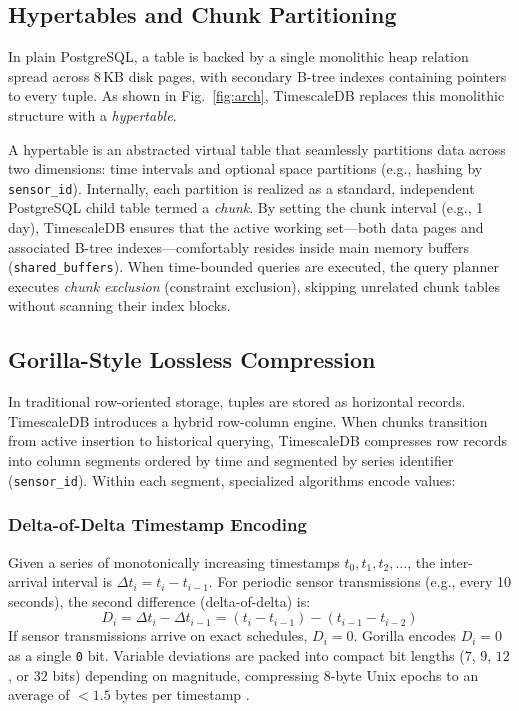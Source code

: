 \documentclass[conference,a4paper]{IEEEtran}
\begin{document}
\subsection{Hypertables and Chunk Partitioning}
In plain PostgreSQL, a table is backed by a single monolithic heap relation spread across 8\,KB disk pages, with secondary B-tree indexes containing pointers to every tuple. As shown in Fig.~\ref{fig:arch}, TimescaleDB replaces this monolithic structure with a \textit{hypertable}. 

A hypertable is an abstracted virtual table that seamlessly partitions data across two dimensions: time intervals and optional space partitions (e.g., hashing by \texttt{sensor\_id}). Internally, each partition is realized as a standard, independent PostgreSQL child table termed a \textit{chunk}. By setting the chunk interval (e.g., 1 day), TimescaleDB ensures that the active working set---both data pages and associated B-tree indexes---comfortably resides inside main memory buffers (\texttt{shared\_buffers}). When time-bounded queries are executed, the query planner executes \textit{chunk exclusion} (constraint exclusion), skipping unrelated chunk tables without scanning their index blocks.

\subsection{Gorilla-Style Lossless Compression}
In traditional row-oriented storage, tuples are stored as horizontal records. TimescaleDB introduces a hybrid row-column engine. When chunks transition from active insertion to historical querying, TimescaleDB compresses row records into column segments ordered by time and segmented by series identifier (\texttt{sensor\_id}). Within each segment, specialized algorithms encode values:

\subsubsection{Delta-of-Delta Timestamp Encoding}
Given a series of monotonically increasing timestamps $t_0, t_1, t_2, \dots$, the inter-arrival interval is $\Delta t_i = t_i - t_{i-1}$. For periodic sensor transmissions (e.g., every 10 seconds), the second difference (delta-of-delta) is:
\begin{equation}
    D_i = \Delta t_i - \Delta t_{i-1} = (t_i - t_{i-1}) - (t_{i-1} - t_{i-2})
\end{equation}
If sensor transmissions arrive on exact schedules, $D_i = 0$. Gorilla encodes $D_i = 0$ as a single \texttt{0} bit. Variable deviations are packed into compact bit lengths ($7$, $9$, $12$, or $32$ bits) depending on magnitude, compressing 8-byte Unix epochs to an average of $<1.5$ bytes per timestamp \cite{pelkonen2015gorilla, bader2021survey}.
\end{document}
